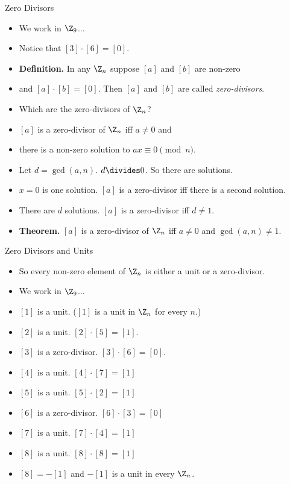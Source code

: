 \documentclass{beamer}
\begin{document}
\begin{frame}{Zero Divisors}
\begin{itemize}
  \item We work in $\Z_9$...
  \item Notice that $[3] \cdot [6] = [0]$.
  \item \textbf{Definition.} In any $\Z_n$ suppose $[a]$ and $[b]$ are non-zero
  \item and $[a]\cdot [b] = [0]$. Then $[a]$ and $[b]$ are called \emph{zero-divisors}.
  \item Which are the zero-divisors of $\Z_n$?
  \item $[a]$ is a zero-divisor of $\Z_n$ iff $a\not=0$ and
  \item there is a non-zero solution to $ax \equiv 0 \pmod n$.
  \item Let $d=\gcd(a,n)$. $d\divides 0$. So there are solutions.
  \item $x=0$ is one solution. $[a]$ is a zero-divisor iff there is a second solution.
  \item There are $d$ solutions. $[a]$ is a zero-divisor iff $d\not=1$.
  \item \textbf{Theorem.} $[a]$ is a zero-divisor of $\Z_n$ iff $a\not=0$ and $\gcd(a, n) \not= 1$.
\end{itemize}
\end{frame}

\begin{frame}{Zero Divisors and Units}
\begin{itemize}
  \item So every non-zero element of $\Z_n$ is either a unit or a zero-divisor.
  \item We work in $\Z_9$...
  \item $[1]$ is a unit. ($[1]$ is a unit in $\Z_n$ for every $n$.)
  \item $[2]$ is a unit. $[2]\cdot [5] = [1]$.
  \item $[3]$ is a zero-divisor. $[3]\cdot[6] = [0]$.
  \item $[4]$ is a unit. $[4]\cdot [7] = [1]$
  \item $[5]$ is a unit. $[5]\cdot [2] = [1]$
  \item $[6]$ is a zero-divisor. $[6]\cdot [3] = [0]$
  \item $[7]$ is a unit. $[7]\cdot [4] = [1]$
  \item $[8]$ is a unit. $[8]\cdot [8] = [1]$
  \item $[8] = -[1]$ and $-[1]$ is a unit in every $\Z_n$.
\end{itemize}
\end{frame}
\end{document}
